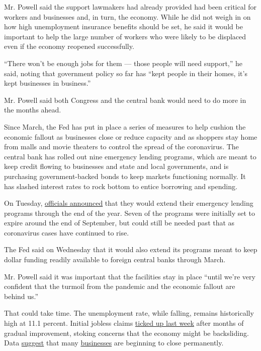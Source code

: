 Mr. Powell said the support lawmakers had already provided had been
critical for workers and businesses and, in turn, the economy. While he
did not weigh in on how high unemployment insurance benefits should be
set, he said it would be important to help the large number of workers
who were likely to be displaced even if the economy reopened
successfully.

``There won't be enough jobs for them --- those people will need
support,'' he said, noting that government policy so far has ``kept
people in their homes, it's kept businesses in business.''

Mr. Powell said both Congress and the central bank would need to do more
in the months ahead.

Since March, the Fed has put in place a series of measures to help
cushion the economic fallout as businesses close or reduce capacity and
as shoppers stay home from malls and movie theaters to control the
spread of the coronavirus. The central bank has rolled out nine
emergency lending programs, which are meant to keep credit flowing to
businesses and state and local governments, and is purchasing
government-backed bonds to keep markets functioning normally. It has
slashed interest rates to rock bottom to entice borrowing and spending.

On Tuesday,
\href{https://www.nytimes3xbfgragh.onion/2020/07/28/business/economy/coronavirus-federal-reserve-policy.html}{officials
announced} that they would extend their emergency lending programs
through the end of the year. Seven of the programs were initially set to
expire around the end of September, but could still be needed past that
as coronavirus cases have continued to rise.

The Fed said on Wednesday that it would also extend its programs meant
to keep dollar funding readily available to foreign central banks
through March.

Mr. Powell said it was important that the facilities stay in place
``until we're very confident that the turmoil from the pandemic and the
economic fallout are behind us.''

That could take time. The unemployment rate, while falling, remains
historically high at 11.1 percent. Initial jobless claims
\href{https://www.nytimes3xbfgragh.onion/2020/07/23/business/economy/unemployment-economy-coronavirus.html}{ticked
up last week} after months of gradual improvement, stoking concerns that
the economy might be backsliding. Data
\href{https://www.washingtonpost.com/business/2020/07/23/permanent-business-closures-yelp/}{suggest}
that many
\href{https://www.nytimes3xbfgragh.onion/2020/07/13/business/small-businesses-coronavirus.html}{businesses}
are beginning to close permanently.

